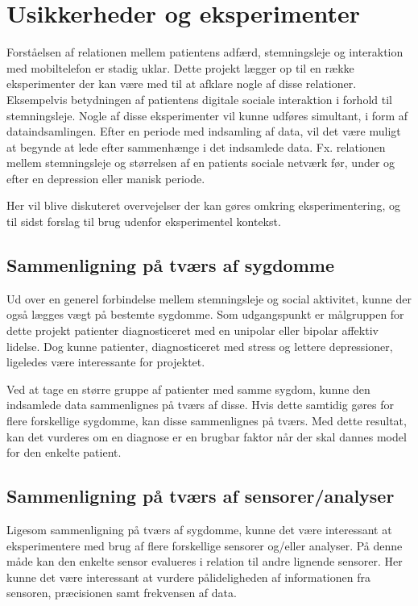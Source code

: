 \section{Usikkerheder og eksperimenter}\label{refleksion:usikkerhed}
Forståelsen af relationen mellem patientens adfærd, stemningsleje og interaktion med mobiltelefon er stadig uklar.
Dette projekt lægger op til en række eksperimenter der kan være med til at afklare nogle af disse relationer.
Eksempelvis betydningen af patientens digitale sociale interaktion i forhold til stemningsleje.
Nogle af disse eksperimenter vil kunne udføres simultant, i form af dataindsamlingen.
Efter en periode med indsamling af data, vil det være muligt at begynde at lede efter sammenhænge i det indsamlede data.
Fx. relationen mellem stemningsleje og størrelsen af en patients sociale netværk før, under og efter en depression eller manisk periode.

Her vil blive diskuteret overvejelser der kan gøres omkring eksperimentering, og til sidst forslag til brug udenfor eksperimentel kontekst.

\subsection{Sammenligning på tværs af sygdomme}\label{refleksion:tvaers_af_sygdomme}
Ud over en generel forbindelse mellem stemningsleje og social aktivitet, kunne der også lægges vægt på bestemte sygdomme.
Som udgangspunkt er målgruppen for dette projekt patienter diagnosticeret med en unipolar eller bipolar affektiv lidelse.
Dog kunne patienter, diagnosticeret med stress og lettere depressioner, ligeledes være interessante for projektet.

Ved at tage en større gruppe af patienter med samme sygdom, kunne den indsamlede data sammenlignes på tværs af disse.
Hvis dette samtidig gøres for flere forskellige sygdomme, kan disse sammenlignes på tværs.
Med dette resultat, kan det vurderes om en diagnose er en brugbar faktor når der skal dannes model for den enkelte patient.

\subsection{Sammenligning på tværs af sensorer/analyser}
Ligesom sammenligning på tværs af sygdomme, kunne det være interessant at eksperimentere med brug af flere forskellige sensorer og/eller analyser.
På denne måde kan den enkelte sensor evalueres i relation til andre lignende sensorer.
Her kunne det være interessant at vurdere pålideligheden af informationen fra sensoren, præcisionen samt frekvensen af data.

